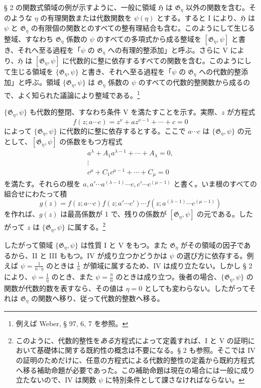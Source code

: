 § 2 の関数式領域の例が示すように、一般に領域 $\mathfrak H$ は $\mathfrak G_\eta$ 以外の関数を含む。そのような $\eta$ の有理関数または代数関数を $\psi(\eta)$ とする。すると I により、$\mathfrak H$ は $\psi$ と $\mathfrak G_\eta$ の有限個の関数とのすべての整有理結合も含む。このようにして生じる整域、すなわち $\mathfrak G_\eta$ 係数の $\psi$ のすべての多項式から成る整域を $[\mathfrak G_\eta,\psi]$ と書き、それへ至る過程を「$\psi$ の $\mathfrak G_\eta$ への有理的整添加」と呼ぶ。さらに V により、$\mathfrak H$ は $[\mathfrak G_\eta,\psi]$ に代数的に整に依存するすべての関数を含む。このようにして生じる領域を $\{\mathfrak G_\eta,\psi\}$ と書き、それへ至る過程を「$\psi$ の $\mathfrak G_\eta$ への代数的整添加」と呼ぶ。領域 $\{\mathfrak G_\eta,\psi\}$ は $\mathfrak G_\eta$ 係数の $\psi$ のすべての代数的整関数から成るので、よく知られた議論により整域である。\footnote{例えば Weber, § 97, 6, 7 を参照。}

$\{\mathfrak G_\eta,\psi\}$ も代数的整閉、すなわち条件 V を満たすことを示す。実際、$z$ が方程式
\[
 f(z;a\cdots c)=z^\nu+a z^{\nu-1}+\cdots+c=0
\]
によって $\{\mathfrak G_\eta,\psi\}$ に代数的に整に依存するとする。ここで $a\cdots c$ は $\{\mathfrak G_\eta,\psi\}$ の元として、$[\mathfrak G_\eta,\psi]$ の係数をもつ方程式
\[
\begin{gathered}
 a^\lambda+A_1a^{\lambda-1}+\cdots+A_\lambda=0,\\
 \vdots\\
 c^\mu+C_1c^{\mu-1}+\cdots+C_\mu=0
\end{gathered}
\]
を満たす。それらの根を
$a,a'\cdots a^{(\lambda-1)}\cdots c,c'\cdots c^{(\mu-1)}$ と書く。いま根のすべての組合せにわたって積
\[
 g(z)=f(z;a\cdots c)f(z;a'\cdots c')\cdots
      f(z;a^{(\lambda-1)}\cdots c^{(\mu-1)})
\]
を作れば、$g(z)$ は最高係数が 1 で、残りの係数が $[\mathfrak G_\eta,\psi]$ の元である。したがって $z$ は $\{\mathfrak G_\eta,\psi\}$ に属する。\footnote{このように、代数的整性を\emph{ある}方程式によって定義すれば、I と V の証明において基礎体に関する既約性の概念は不要になる。§ 2 も参照。そこでは IV の証明のためだけに、任意の方程式による代数的整性の定義から既約方程式へ移る補助命題が必要であった。この補助命題は現在の場合には一般に成り立たないので、IV は関数 $\psi$ に特別条件として課さなければならない。}

したがって領域 $\{\mathfrak G_\eta,\psi\}$ は性質 I と V をもつ。また $\mathfrak G_\eta$ がその領域の因子であるから、II と III ももつ。IV が成り立つかどうかは $\psi$ の選び方に依存する。例えば $\psi=\frac{1}{n\cdot\eta}$ のときは $\frac1n$ が領域に属するため、IV は成り立たない。しかし § 2 により、$\psi=\frac1\eta$ のとき、また $\psi=\frac{\eta}{n}$ のときは成り立つ。後者の場合、$\{\mathfrak G_\eta,\psi\}$ の関数が代数的数を表すなら、その値は $\eta=0$ としても変わらない。したがってそれは $\mathfrak G_\eta$ の関数へ移り、従って代数的整数へ移る。

